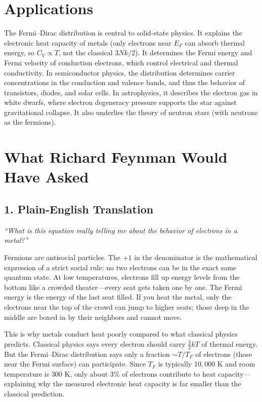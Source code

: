 \documentclass[11pt,openright]{book}
\begin{document}
\section*{Applications}

The Fermi--Dirac distribution is central to solid-state physics. It explains the electronic heat capacity of metals (only electrons near $E_F$ can absorb thermal energy, so $C_V \propto T$, not the classical $3Nk/2$). It determines the Fermi energy and Fermi velocity of conduction electrons, which control electrical and thermal conductivity. In semiconductor physics, the distribution determines carrier concentrations in the conduction and valence bands, and thus the behavior of transistors, diodes, and solar cells. In astrophysics, it describes the electron gas in white dwarfs, where electron degeneracy pressure supports the star against gravitational collapse. It also underlies the theory of neutron stars (with neutrons as the fermions).
\section*{What Richard Feynman Would Have Asked}

\subsection*{1. Plain-English Translation}
\textit{``What is this equation really telling me about the behavior of electrons in a metal?''}

Fermions are antisocial particles. The $+1$ in the denominator is the mathematical expression of a strict social rule: no two electrons can be in the exact same quantum state. At low temperatures, electrons fill up energy levels from the bottom like a crowded theater---every seat gets taken one by one. The Fermi energy is the energy of the last seat filled. If you heat the metal, only the electrons near the top of the crowd can jump to higher seats; those deep in the middle are boxed in by their neighbors and cannot move.

This is why metals conduct heat poorly compared to what classical physics predicts. Classical physics says every electron should carry $\frac{3}{2}kT$ of thermal energy. But the Fermi--Dirac distribution says only a fraction $\sim T/T_F$ of electrons (those near the Fermi surface) can participate. Since $T_F$ is typically $10{,}000$ K and room temperature is $300$ K, only about $3\%$ of electrons contribute to heat capacity---explaining why the measured electronic heat capacity is far smaller than the classical prediction.
\end{document}
